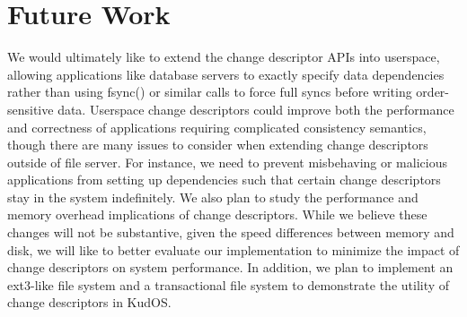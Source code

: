 \preparagraphspacing{}
\section*{Future Work}
\label{sec:future}

We would ultimately like to extend the change descriptor APIs into
userspace, allowing applications like database servers to exactly
specify data dependencies rather than using fsync() or similar calls
to force full syncs before writing order-sensitive data. Userspace
change descriptors could improve both the performance and correctness
of applications requiring complicated consistency semantics, though
there are many issues to consider when extending change descriptors
outside of file server. For instance, we need to prevent misbehaving
or malicious applications from setting up dependencies such that
certain change descriptors stay in the system indefinitely. We also
plan to study the performance and memory overhead implications of
change descriptors. While we believe these changes will not be
substantive, given the speed differences between memory and disk,
we will like to better evaluate our implementation to minimize the
impact of change descriptors on system performance. In addition, we
plan to implement an ext3-like file system and a transactional file
system to demonstrate the utility of change descriptors in KudOS.
